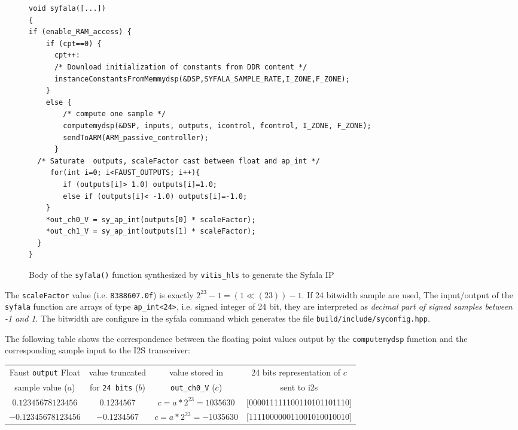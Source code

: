 \documentclass[11pt]{article}
\numberwithin{equation}{section}
\numberwithin{figure}{section}
\begin{document}
\begin{figure}

\begin{boxedminipage}{\textwidth}
    \small
\begin{verbatim}
void syfala([...])
{
if (enable_RAM_access) {
    if (cpt==0) {
      cpt++:
      /* Download initialization of constants from DDR content */
      instanceConstantsFromMemmydsp(&DSP,SYFALA_SAMPLE_RATE,I_ZONE,F_ZONE);
    }
    else {
        /* compute one sample */
        computemydsp(&DSP, inputs, outputs, icontrol, fcontrol, I_ZONE, F_ZONE);
        sendToARM(ARM_passive_controller);
      } 
  /* Saturate  outputs, scaleFactor cast between float and ap_int */
     for(int i=0; i<FAUST_OUTPUTS; i++){
    	if (outputs[i]> 1.0) outputs[i]=1.0;
    	else if (outputs[i]< -1.0) outputs[i]=-1.0;
    }
    *out_ch0_V = sy_ap_int(outputs[0] * scaleFactor);
    *out_ch1_V = sy_ap_int(outputs[1] * scaleFactor);
  }
}
\end{verbatim}
\end{boxedminipage}
\caption{Body of the {\tt syfala()} function synthesized by {\tt vitis\_hls} to generate the Syfala IP}
\label{fig:body}
\end{figure}


The {\tt scaleFactor} value (i.e. {\tt 8388607.0f}) is exactly $2^{23}-1 =  (1 \ll (23)) -1$. If 24 bitwidth sample are used, The input/output of the {\tt syfala} function are arrays of type {\tt ap\_int<24>}, i.e. signed integer of 24 bit, they are interpreted as {\em decimal part of signed samples between -1 and 1}. The bitwidth are configure in the syfala command which generates the file {\tt build/include/syconfig.hpp}. 

The following table shows the correspondence between the floating point values output by the {\tt computemydsp} function and the corresponding sample input to the I2S transceiver:
{\small
  \begin{tabular}{|c|c|c|c|}
  \hline
  Faust {\tt output} Float  & value truncated  & value stored in  & 24 bits representation of $c$\\
  sample value ($a$) & for {\tt 24 bits} ($b$) &   {\tt out\_ch0\_V} ($c$)  & sent to i2s  \\
  \hline 
  $0.12345678123456$ & $0.1234567$ & $c=a*2^{23}=1035630$ & [000011111100110101101110] \\
  \hline
$-0.12345678123456$ & $-0.1234567$ & $c=a*2^{23}=-1035630$ & [111100000011001010010010]\\
\hline
\end{tabular}
}
\end{document}
